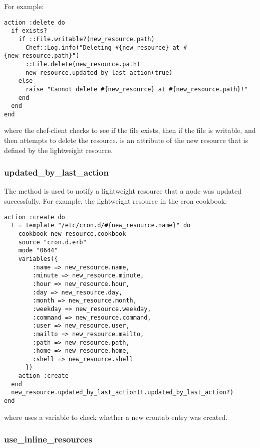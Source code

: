 For example:

\begin{lstlisting}[label=lst:cookbook-lwrp-dsl-new-resource]
action :delete do
  if exists?
    if ::File.writable?(new_resource.path)
      Chef::Log.info("Deleting #{new_resource} at #{new_resource.path}")
      ::File.delete(new_resource.path)
      new_resource.updated_by_last_action(true)
    else
      raise "Cannot delete #{new_resource} at #{new_resource.path}!"
    end
  end
end
\end{lstlisting}

where the chef-client checks to see if the file exists, then if the file is writable, and then attempts to delete the resource.  is an attribute of the new resource that is defined by the lightweight resource.

\subsubsection{updated\_by\_last\_action}

The  method is used to notify a lightweight resource that a node was updated successfully. For example, the  lightweight resource in the cron cookbook:

\begin{lstlisting}[label=lst:cookbook-lwrp-dsl-updated]
action :create do
  t = template "/etc/cron.d/#{new_resource.name}" do
    cookbook new_resource.cookbook
    source "cron.d.erb"
    mode "0644"
    variables({
        :name => new_resource.name,
        :minute => new_resource.minute,
        :hour => new_resource.hour,
        :day => new_resource.day,
        :month => new_resource.month,
        :weekday => new_resource.weekday,
        :command => new_resource.command,
        :user => new_resource.user,
        :mailto => new_resource.mailto,
        :path => new_resource.path,
        :home => new_resource.home,
        :shell => new_resource.shell
      })
    action :create
  end
  new_resource.updated_by_last_action(t.updated_by_last_action?)
end
\end{lstlisting}

where  uses a variable to check whether a new crontab entry was created.

\subsubsection{use\_inline\_resources}

